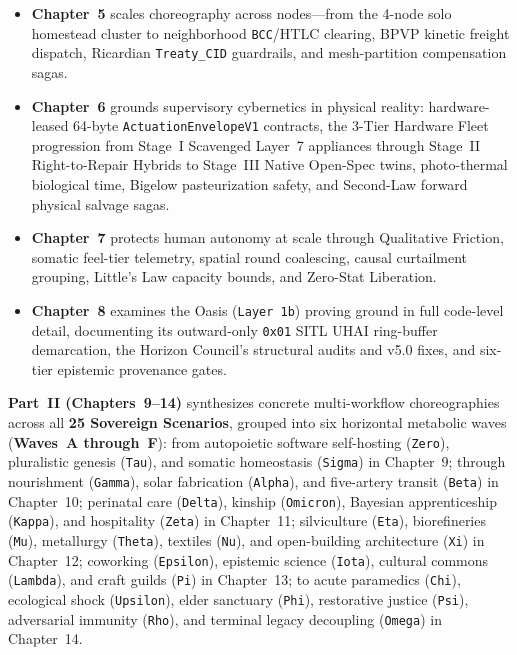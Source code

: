 \begin{itemize}
        broadcast signals, 256-bit correlation keys, and acyclic temporal Bill-of-Materials
        (BOM) directed acyclic graphs.
\item \textbf{Chapter~5} scales choreography across nodes---from the 4-node solo homestead
        cluster to neighborhood \texttt{BCC}/HTLC clearing, BPVP kinetic freight dispatch,
        Ricardian \texttt{Treaty\_CID} guardrails, and mesh-partition compensation sagas.
\item \textbf{Chapter~6} grounds supervisory cybernetics in physical reality:
        hardware-leased 64-byte \texttt{ActuationEnvelopeV1} contracts, the 3-Tier Hardware
        Fleet progression from Stage~I Scavenged Layer~7 appliances through Stage~II
        Right-to-Repair Hybrids to Stage~III Native Open-Spec twins, photo-thermal biological
        time, Bigelow pasteurization safety, and Second-Law forward physical salvage sagas.
\item \textbf{Chapter~7} protects human autonomy at scale through Qualitative Friction,
        somatic feel-tier telemetry, spatial round coalescing, causal curtailment grouping,
        Little's Law capacity bounds, and Zero-Stat Liberation.
\item \textbf{Chapter~8} examines the Oasis (\texttt{Layer 1b}) proving ground in full
        code-level detail, documenting its outward-only \texttt{0x01} SITL UHAI ring-buffer
        demarcation, the Horizon Council's structural audits and v5.0 fixes, and six-tier
        epistemic provenance gates.
\end{itemize}

\textbf{Part~II (Chapters~9--14)} synthesizes concrete multi-workflow choreographies across all \textbf{25 Sovereign Scenarios}, grouped into six horizontal metabolic waves (\textbf{Waves~A through~F}): from autopoietic software self-hosting (\texttt{Zero}), pluralistic genesis (\texttt{Tau}), and somatic homeostasis (\texttt{Sigma}) in Chapter~9; through nourishment (\texttt{Gamma}), solar fabrication (\texttt{Alpha}), and five-artery transit (\texttt{Beta}) in Chapter~10; perinatal care (\texttt{Delta}), kinship (\texttt{Omicron}), Bayesian apprenticeship (\texttt{Kappa}), and hospitality (\texttt{Zeta}) in Chapter~11; silviculture (\texttt{Eta}), biorefineries (\texttt{Mu}), metallurgy (\texttt{Theta}), textiles (\texttt{Nu}), and open-building architecture (\texttt{Xi}) in Chapter~12; coworking (\texttt{Epsilon}), epistemic science (\texttt{Iota}), cultural commons (\texttt{Lambda}), and craft guilds (\texttt{Pi}) in Chapter~13; to acute paramedics (\texttt{Chi}), ecological shock (\texttt{Upsilon}), elder sanctuary (\texttt{Phi}), restorative justice (\texttt{Psi}), adversarial immunity (\texttt{Rho}), and terminal legacy decoupling (\texttt{Omega}) in Chapter~14.

